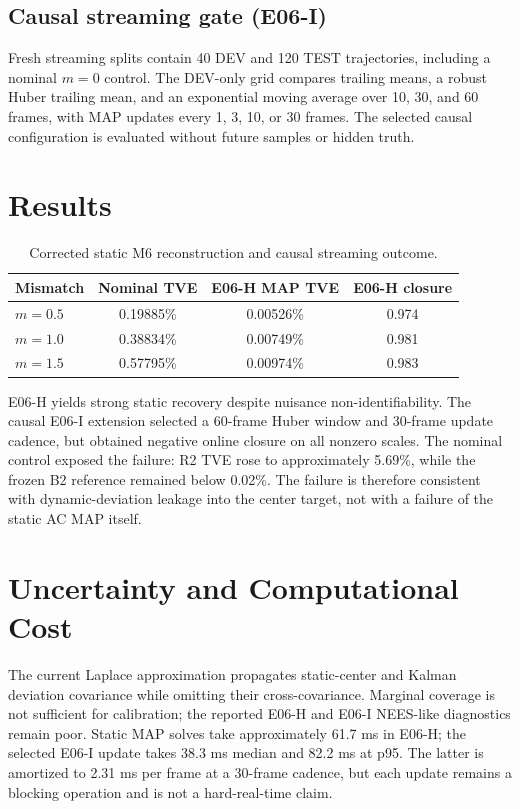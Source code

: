 \documentclass[journal]{IEEEtran}
\begin{document}
\subsection{Causal streaming gate (E06-I)}
Fresh streaming splits contain 40 DEV and 120 TEST trajectories, including a
nominal $m=0$ control. The DEV-only grid compares trailing means, a robust
Huber trailing mean, and an exponential moving average over 10, 30, and 60
frames, with MAP updates every 1, 3, 10, or 30 frames. The selected causal
configuration is evaluated without future samples or hidden truth.

\section{Results}
\begin{table}[t]
\centering
\caption{Corrected static M6 reconstruction and causal streaming outcome.}
\label{tab:summary}
\begin{tabular}{lccc}
\toprule
Mismatch & Nominal TVE & E06-H MAP TVE & E06-H closure\\
\midrule
$m=0.5$ & 0.19885\% & 0.00526\% & 0.974\\
$m=1.0$ & 0.38834\% & 0.00749\% & 0.981\\
$m=1.5$ & 0.57795\% & 0.00974\% & 0.983\\
\bottomrule
\end{tabular}
\end{table}

E06-H yields strong static recovery despite nuisance non-identifiability. The
causal E06-I extension selected a 60-frame Huber window and 30-frame update
cadence, but obtained negative online closure on all nonzero scales. The
nominal control exposed the failure: R2 TVE rose to approximately 5.69\%, while
the frozen B2 reference remained below 0.02\%. The failure is therefore
consistent with dynamic-deviation leakage into the center target, not with a
failure of the static AC MAP itself.

\section{Uncertainty and Computational Cost}
The current Laplace approximation propagates static-center and Kalman
deviation covariance while omitting their cross-covariance. Marginal coverage
is not sufficient for calibration; the reported E06-H and E06-I NEES-like
diagnostics remain poor. Static MAP solves take approximately 61.7 ms in E06-H;
the selected E06-I update takes 38.3 ms median and 82.2 ms at p95. The latter is
amortized to 2.31 ms per frame at a 30-frame cadence, but each update remains a
blocking operation and is not a hard-real-time claim.
\end{document}
